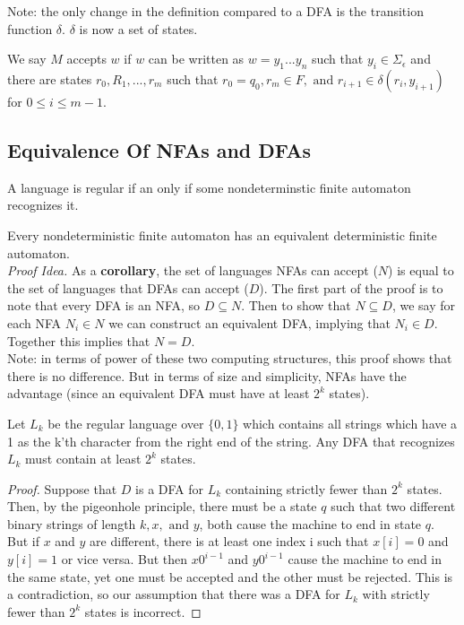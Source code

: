 \documentclass[11pt,a4paper]{article}
\begin{document}
Note: the only change in the definition compared to a DFA is the transition function $\delta$. $\delta$ is now a set of states.

We say $M$ accepts $w$ if $w$ can be written as $w=y_1...y_n$ such that $y_i\in\Sigma_{\epsilon}$ and there are states $r_0,R_1,...,r_m$ such that $r_0=q_0,r_m\in F,\text{ and }r_{i+1}\in\delta(r_i,y_{i+1})$ for $0\leq i\leq m - 1$.

\subsection{Equivalence Of NFAs and DFAs}
\begin{corollary}
    A language is regular if an only if some nondeterminstic finite automaton recognizes it.
\end{corollary}

\begin{theorem}
    Every nondeterministic finite automaton has an equivalent deterministic finite automaton. \\

    \textit{Proof Idea.} As a \textbf{corollary}, the set of languages NFAs can accept ($N$) is equal to the set of languages that DFAs can accept ($D$).
    The first part of the proof is to note that every DFA is an NFA, so $D\subseteq N$.
    Then to show that $N\subseteq D$, we say for each NFA $N_i\in N$ we can construct an equivalent DFA, implying that $N_i\in D$. Together this implies that $N=D$. \\

    Note: in terms of power of these two computing structures, this proof shows that there is no difference.
But in terms of size and simplicity, NFAs have the advantage (since an equivalent DFA must have at least $2^k$ states).
\end{theorem}

\begin{theorem}
    Let $L_k$ be the regular language over $\{0,1\}$ which contains all strings which have a 1 as the k'th character from the right end of the string.
    Any DFA that recognizes $L_k$ must contain at least $2^k$ states.

    \begin{proof}
        Suppose that $D$ is a DFA for $L_k$ containing strictly fewer than $2^k$ states. Then, by the pigeonhole principle, there must be a state $q$ such that two different binary strings of length $k,x,\text{ and }y$, both cause the machine to end in state $q$.
        But if $x$ and $y$ are different, there is at least one index i such that $x[i]=0$ and $y[i]=1$ or vice versa. But then $x0^{i-1}$ and $y0^{i-1}$ cause the machine to end in the same state, yet one must be accepted and the other must be rejected.
        This is a contradiction, so our assumption that there was a DFA for $L_k$ with strictly fewer than $2^k$ states is incorrect.
    \end{proof}
\end{theorem}
\end{document}
